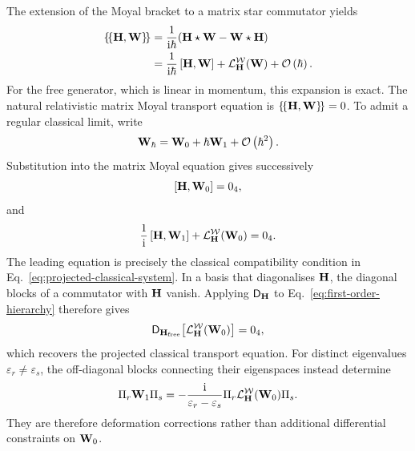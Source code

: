 \documentclass[final,5p,times,twocolumn]{elsarticle}
\begin{document}
The extension of the Moyal bracket to a matrix star commutator yields
\begin{align}
	  \{\!\{\mathbf{\mathbf{H}},\mathbf{\mathbf{W}}\}\!\} &= \frac{1}{\mathrm{i}\hbar}({\mathbf{H}} \star {\mathbf{W}} - \mathbf{W} \star \mathbf{H} )\nonumber \\ &= \frac{1}{\mathrm{i}  \hbar}
      \left[{\mathbf{\mathbf{H}}} ,{\mathbf{\mathbf{W}}}\right] +
	  \mathcal{L}^{\mathcal{W}}_{\mathbf{H}}(\mathbf{W})+\mathcal{O}\left(\hbar \right).
\end{align}
For the free generator, which is linear in momentum, this expansion is exact. The natural relativistic matrix Moyal transport equation is $\{\!\{\mathbf{H},\mathbf{W}\}\!\}=0$. To admit a regular classical limit, write
\begin{equation}
    \mathbf{W}_\hbar
    =
    \mathbf{W}_0+\hbar\mathbf{W}_1+\mathcal{O}\left(\hbar^2 \right).
    \label{eq:semiclassical-expansion}
\end{equation}
Substitution into the matrix Moyal equation gives successively
\begin{equation}
    \left[{\mathbf{H}} ,{\mathbf{W}_0}\right]=0_4,
    \label{eq:leading-commutator}
\end{equation}
and
\begin{equation}
    \frac{1}{\mathrm{i}}\left[{\mathbf{H}} ,{\mathbf{W}_1}\right]
    +
    \mathcal{L}^{\mathcal{W}}_{\mathbf{H}}(\mathbf{W}_0)
    =0_4.
    \label{eq:first-order-hierarchy}
\end{equation}
The leading equation is precisely the classical compatibility condition in Eq.~\eqref{eq:projected-classical-system}. In a basis that diagonalises $\mathbf{H}$, the diagonal blocks of a commutator with $\mathbf{H}$ vanish. Applying $\mathsf{D}_{\mathbf{H}}$ to Eq.~\eqref{eq:first-order-hierarchy} therefore gives
\begin{equation}
    \mathsf{D}_{\mathbf{H}_{\mathrm{free}}}\!\left[
        \mathcal{L}^{\mathcal{W}}_{\mathbf{H}}(\mathbf{W}_0)
    \right]
    =0_4,
    \label{eq:projected-solvability}
\end{equation}
which recovers the projected classical transport equation. For distinct eigenvalues $\varepsilon_r\ne\varepsilon_s$, the off-diagonal blocks connecting their eigenspaces instead determine
\begin{equation}
    \Pi_r\mathbf{W}_1\Pi_s
    =
    -\frac{\mathrm{i}}{\varepsilon_r-\varepsilon_s}
    \Pi_r\mathcal{L}^{\mathcal{W}}_{\mathbf{H}}(\mathbf{W}_0)\Pi_s.
    \label{eq:off-diagonal-correction}
\end{equation}
They are therefore deformation corrections rather than additional differential constraints on $\mathbf{W}_0$. 
\end{document}

